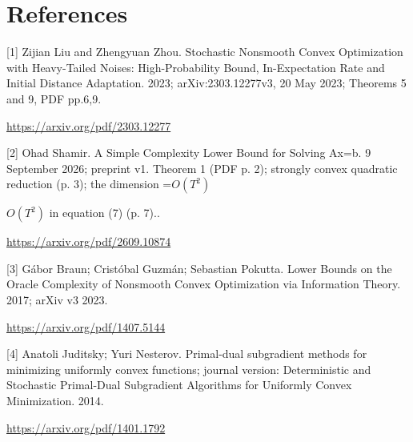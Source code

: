 \documentclass[10pt,a4paper]{article}
\newcommand{\AtlasMath}[1]{\par\begingroup\centering\setbox0=\hbox{$\displaystyle #1$}\ifdim\wd0>1.4\linewidth\typeout{ATLAS WIDE FORMULA: \the\wd0}\fi\ifdim\wd0>\linewidth\resizebox{\linewidth}{!}{\box0}\else\box0\fi\par\endgroup}
\newcommand{\AtlasInlineMath}[1]{\begingroup\setbox0=\hbox{$#1$}\ifdim\wd0>.4\linewidth\endgroup\AtlasMath{#1}\else\endgroup$#1$\fi}
\begin{document}
\section{References}
[1] Zijian Liu and Zhengyuan Zhou. Stochastic Nonsmooth Convex Optimization with Heavy-Tailed Noises: High-Probability Bound, In-Expectation Rate and Initial Distance Adaptation. 2023; arXiv:2303.12277v3, 20 May 2023; Theorems 5 and 9, PDF pp.6,9.

\url{https://arxiv.org/pdf/2303.12277}

[2] Ohad Shamir. A Simple Complexity Lower Bound for Solving Ax=b. 9 September 2026; preprint v1. Theorem 1 (PDF p. 2); strongly convex quadratic reduction (p. 3); the dimension \AtlasInlineMath{O(T^2)} in equation (7) (p. 7)..

\url{https://arxiv.org/pdf/2609.10874}

[3] Gábor Braun; Cristóbal Guzmán; Sebastian Pokutta. Lower Bounds on the Oracle Complexity of Nonsmooth Convex Optimization via Information Theory. 2017; arXiv v3 2023.

\url{https://arxiv.org/pdf/1407.5144}

[4] Anatoli Juditsky; Yuri Nesterov. Primal-dual subgradient methods for minimizing uniformly convex functions; journal version: Deterministic and Stochastic Primal-Dual Subgradient Algorithms for Uniformly Convex Minimization. 2014.

\url{https://arxiv.org/pdf/1401.1792}
\end{document}

